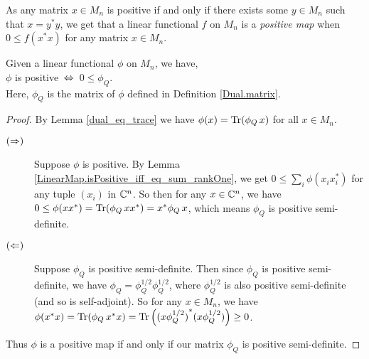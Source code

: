   As any matrix $x\in{M_n}$ is positive if and only if there exists some $y\in M_n$ such that $x=y^*y$, we get that a linear functional $f$ on $M_n$ is a \textit{positive map} when $0\leq{f(x^*x)}$ for any matrix $x\in{M_n}$.

  \begin{lemma}\label{Dual.isPosMap_iff_of_matrix}\leanok
   Given a linear functional $\phi$ on $M_n$, we have,\\
   \hspace*{0.5cm}$\phi$ is positive $\,\Leftrightarrow\,$ $0\leq\phi_Q$.\\
   Here, $\phi_Q$ is the matrix of $\phi$ defined in Definition \ref{Dual.matrix}.
  \end{lemma}
  \begin{proof}\leanok
   By Lemma \ref{dual_eq_trace} we have $\phi(x)=\operatorname{Tr}(\phi_Q\, x)$ for all $x\in{M_n}$.
   \begin{description}
    \item[$(\Rightarrow)$]
     Suppose $\phi$ is positive. By Lemma \ref{LinearMap.isPositive_iff_eq_sum_rankOne}, we get $0\leq\sum_i\phi(x_ix_i^*)$ for any tuple $(x_i)$ in $\mathbb{C}^n$. So then for any $x\in\mathbb{C}^n$, we have $0\leq\phi(xx^*)=\operatorname{Tr}(\phi_Q\, xx^*)=x^*\phi_Q\, x$, which means $\phi_Q$ is positive semi-definite.
    \item[$(\Leftarrow)$]
     Suppose $\phi_Q$ is positive semi-definite. Then since $\phi_Q$ is positive semi-definite, we have $\phi_Q=\phi_Q^{1/2}\phi_Q^{1/2}$, where $\phi_Q^{1/2}$ is also positive semi-definite (and so is self-adjoint). So for any $x\in{M_n}$, we have $\phi(x^*x)=\operatorname{Tr}(\phi_Q\, x^*x)=\operatorname{Tr}\left({(x\phi_Q^{1/2})}^*(x\phi_Q^{1/2})\right)\geq0$.
   \end{description}
   Thus $\phi$ is a positive map if and only if our matrix $\phi_Q$ is positive semi-definite.
  \end{proof}

